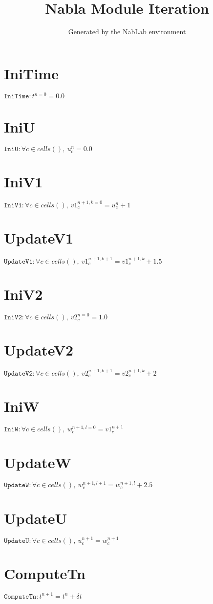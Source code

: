 \documentclass[11pt]{article}
\title{Nabla Module Iteration}
\author{Generated by the NabLab environment}
\begin{document}
\maketitle


\section{IniTime}
$\texttt{IniTime} : t^{n=0} = 0.0$


\section{IniU}
$\texttt{IniU} : \forall{c\in cells()}, \ u^{n}_{c} = 0.0$


\section{IniV1}
$\texttt{IniV1} : \forall{c\in cells()}, \ v1^{n+1, k=0}_{c} = u^{n}_{c} + 1$


\section{UpdateV1}
$\texttt{UpdateV1} : \forall{c\in cells()}, \ v1^{n+1, k+1}_{c} = v1^{n+1, k}_{c} + 1.5$


\section{IniV2}
$\texttt{IniV2} : \forall{c\in cells()}, \ v2^{n=0}_{c} = 1.0$


\section{UpdateV2}
$\texttt{UpdateV2} : \forall{c\in cells()}, \ v2^{n+1, k+1}_{c} = v2^{n+1, k}_{c} + 2$


\section{IniW}
$\texttt{IniW} : \forall{c\in cells()}, \ w^{n+1, l=0}_{c} = v1^{n+1}_{c}$


\section{UpdateW}
$\texttt{UpdateW} : \forall{c\in cells()}, \ w^{n+1, l+1}_{c} = w^{n+1, l}_{c} + 2.5$


\section{UpdateU}
$\texttt{UpdateU} : \forall{c\in cells()}, \ u^{n+1}_{c} = w^{n+1}_{c}$


\section{ComputeTn}
$\texttt{ComputeTn} : t^{n+1} = t^{n} + \delta t$
\end{document}
